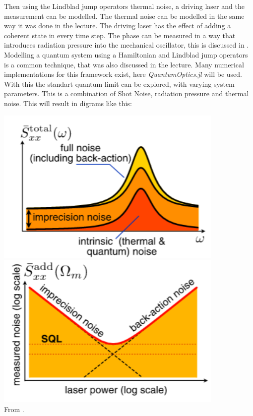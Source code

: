 \documentclass[
	a4page,
	parskip=full,
]{scrartcl}
\begin{document}
Then using the Lindblad jump operators thermal noise, a driving laser and the measurement can be modelled.
The thermal noise can be modelled in the same way it was done in the lecture.
The driving laser has the effect of adding a coherent state in every time step.
The phase can be measured in a way that introduces radiation pressure into the mechanical oscillator, this is discussed in \autocite{aspelmeyer_cavity_2014}.\\
Modelling a quantum system using a Hamiltonian and Lindblad jump operators is a common technique, that was also discussed in the lecture.
Many numerical implementations for this framework exist, here \textit{QuantumOptics.jl} will be used.\\
With this the standart quantum limit can be explored, with varying system parameters.
This is a combination of Shot Noise, radiation pressure and thermal noise.
This will result in digrams like this:
\begin{center}
	\includegraphics[width=.3\textwidth]{figures/a.png}
	\includegraphics[width=.3\textwidth]{figures/b.png}\\
	From \autocite[FIG. 22]{aspelmeyer_cavity_2014}.
\end{center}

\sloppy
\printbibliography
\end{document}
